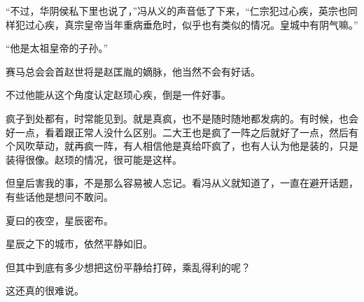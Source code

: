 “不过，华阴侯私下里也说了，”冯从义的声音低了下来，“仁宗犯过心疾，英宗也同样犯过心疾，真宗皇帝当年重病垂危时，似乎也有类似的情况。皇城中有阴气嘛。”

“他是太祖皇帝的子孙。”

赛马总会会首赵世将是赵匡胤的嫡脉，他当然不会有好话。

不过他能从这个角度认定赵顼心疾，倒是一件好事。

疯子到处都有，时常能见到。就是真疯，也不是随时随地都发病的。有时候，也会好一点，看着跟正常人没什么区别。二大王也是疯了一阵之后就好了一点，然后有个风吹草动，就再疯一阵，有人相信他是真给吓疯了，也有人认为他是装的，只是装得很像。赵顼的情况，很可能是这样。

但皇后害我的事，不是那么容易被人忘记。看冯从义就知道了，一直在避开话题，有些话他是想问不敢问。

夏曰的夜空，星辰密布。

星辰之下的城市，依然平静如旧。

但其中到底有多少想把这份平静给打碎，乘乱得利的呢？

这还真的很难说。

